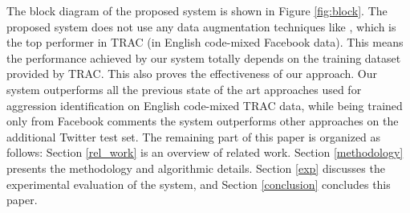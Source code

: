 \documentclass[sigconf]{acmart}
\begin{document}
The block diagram of the proposed system is shown in Figure \ref{fig:block}. The proposed system does not use any data augmentation techniques like \cite{aroyehun2018aggression}, which is the top performer in TRAC (in English code-mixed Facebook data). This means the performance achieved by our system totally depends on the training dataset provided by TRAC. This also proves the effectiveness of our approach. Our system outperforms all the previous state of the art approaches used for aggression identification on English code-mixed TRAC data, while being trained only from Facebook comments the system outperforms other approaches on the additional Twitter test set. The remaining part of this paper is organized as follows: Section \ref{rel_work} is an overview of related work. Section \ref{methodology} presents the methodology and algorithmic details. Section \ref{exp} discusses the experimental evaluation of the system, and Section \ref{conclusion} concludes this paper. 
\end{document}
